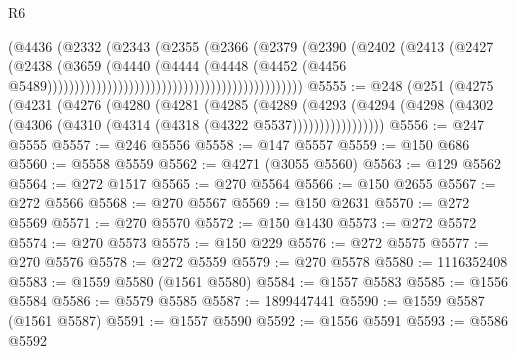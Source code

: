 \begin{lexlean}{R6}
\begin{coremodule}
                                                                (@4436
                                                                  (@2332
                                                                    (@2343
                                                                      (@2355
                                                                        (@2366
                                                                          (@2379
                                                                            (@2390
                                                                              (@2402
                                                                                (@2413
                                                                                  (@2427
                                                                                    (@2438
                                                                                      (@3659
                                                                                        (@4440
                                                                                          (@4444
                                                                                            (@4448
                                                                                              (@4452
                                                                                                (@4456
                                                                                                  @5489)))))))))))))))))))))))))))))))))))))))))))))))
@5555 := @248
    (@251
      (@4275
        (@4231
          (@4276
            (@4280
              (@4281
                (@4285
                  (@4289
                    (@4293
                      (@4294 (@4298 (@4302 (@4306 (@4310 (@4314 (@4318 (@4322 @5537)))))))))))))))))
@5556 := @247 @5555
@5557 := @246 @5556
@5558 := @147 @5557
@5559 := @150 @686
@5560 := @5558 @5559
@5562 := @4271 (@3055 @5560)
@5563 := @129 @5562
@5564 := @272 @1517
@5565 := @270 @5564
@5566 := @150 @2655
@5567 := @272 @5566
@5568 := @270 @5567
@5569 := @150 @2631
@5570 := @272 @5569
@5571 := @270 @5570
@5572 := @150 @1430
@5573 := @272 @5572
@5574 := @270 @5573
@5575 := @150 @229
@5576 := @272 @5575
@5577 := @270 @5576
@5578 := @272 @5559
@5579 := @270 @5578
@5580 := 1116352408
@5583 := @1559 @5580 (@1561 @5580)
@5584 := @1557 @5583
@5585 := @1556 @5584
@5586 := @5579 @5585
@5587 := 1899447441
@5590 := @1559 @5587 (@1561 @5587)
@5591 := @1557 @5590
@5592 := @1556 @5591
@5593 := @5586 @5592

\end{coremodule}
\end{lexlean}
